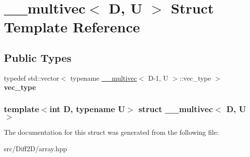 \hypertarget{struct____multivec}{
\section{\_\-\_\-multivec$<$ D, U $>$ Struct Template Reference}
\label{struct____multivec}
}
\subsection*{Public Types}
\begin{DoxyCompactItemize}
\item 
\hypertarget{struct____multivec_a9937ea3f66220e5a8df1af8a1afac678}{
typedef std::vector$<$ typename \hyperlink{struct____multivec}{\_\-\_\-multivec}$<$ D-\/1, U $>$::vec\_\-type $>$ {\bfseries vec\_\-type}}
\label{struct____multivec_a9937ea3f66220e5a8df1af8a1afac678}

\end{DoxyCompactItemize}
\subsubsection*{template$<$int D, typename U$>$ struct \_\-\_\-multivec$<$ D, U $>$}



The documentation for this struct was generated from the following file:\begin{DoxyCompactItemize}
\item 
src/Diff2D/array.hpp\end{DoxyCompactItemize}
